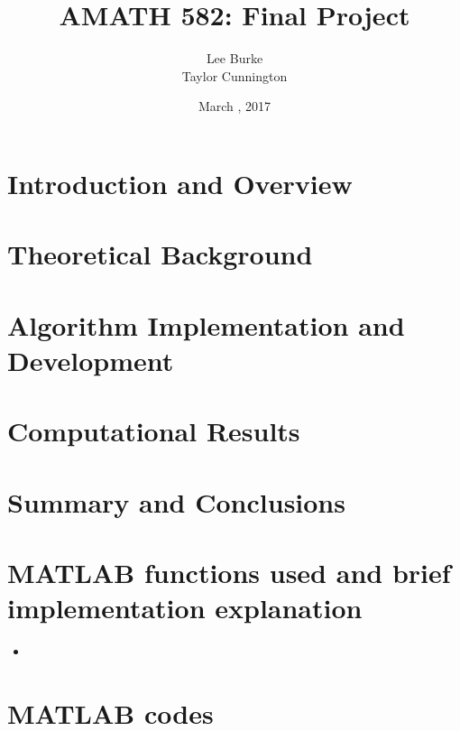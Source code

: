 \documentclass{article}
\title{AMATH 582: Final Project}
\date{March \nth{14}, 2017}
\author{Lee Burke \\ Taylor Cunnington}
\begin{document}
\maketitle
\abstract{
}
\section{Introduction and Overview}

\section{Theoretical Background}

\section{Algorithm Implementation and Development}

\section{Computational Results}

\section{Summary and Conclusions}

\clearpage
\begin{appendices}
\section{MATLAB functions used and brief implementation explanation}
\begin{itemize}
	\item 
\end{itemize}

\section{MATLAB codes}
%
\end{appendices}
\end{document}
